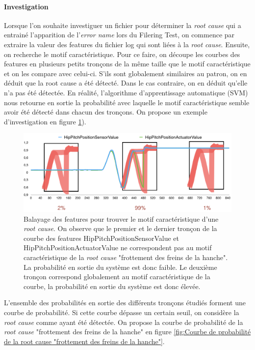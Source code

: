 \paragraph{Investigation}
Lorsque l'on souhaite investiguer un fichier pour déterminer la \emph{root cause} qui a entrainé l'apparition de l'\emph{error name} lors du Filering Test, on commence par extraire la valeur des features du fichier log qui sont liées à la \emph{root cause}. Ensuite, on recherche le motif caractéristique. Pour ce faire, on découpe les courbes des features en plusieurs petits tronçons de la même taille que le motif caractéristique et on les compare avec celui-ci. S'ils sont globalement similaires au patron, on en déduit que la root cause a été détecté. Dans le cas contraire, on en déduit qu'elle n'a pas été détectée. En réalité, l'algorithme d'apprentissage automatique (SVM) nous retourne en sortie la probabilité avec laquelle le motif caractéristique semble avoir été détecté dans chacun des tronçons. On propose un exemple d'investigation en figure \ref{fig:Balayage des features pour retrouver le motif caractéristique d'une root cause}).

\begin{figure}[h]
	\centering\includegraphics[width=15cm]{images/balayage_motif.png}
	\caption[Balayage des features et motif caractéristique d'une root cause]{Balayage des features pour trouver le motif caractéristique d'une \emph{root cause}. On observe que le premier et le dernier tronçon de la courbe des features HipPitchPositionSensorValue et  HipPitchPositionActuatorValue ne correspondent pas au motif caractéristique de la \emph{root cause} "frottement des freins de la hanche". La probabilité en sortie du système est donc faible. Le deuxième tronçon correspond globalement au motif caractéristique de la courbe, la probabilité en sortie du système est donc élevée.}
	\label{fig:Balayage des features pour retrouver le motif caractéristique d'une root cause}
\end{figure}

L'ensemble des probabilités en sortie des différents tronçons étudiés forment une courbe de probabilité. Si cette courbe dépasse un certain seuil, on considère la \emph{root cause} comme ayant été détectée. On propose la courbe de probabilité de la \emph{root cause} "frottement des freins de la hanche" en figure \ref{fig:Courbe de probabilité de la root cause "frottement des freins de la hanche"}.

